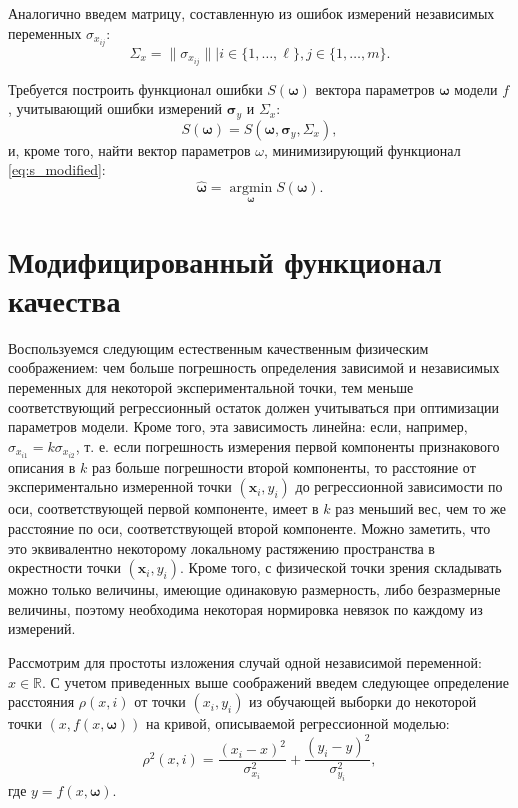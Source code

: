 \documentclass[tikz,11pt,a4paper]{article}
\newcommand{\bomega}{\boldsymbol{\omega}}
\begin{document}
Аналогично введем матрицу, составленную из ошибок измерений независимых переменных
$\sigma_{x_{ij}}$:
\[
  \Sigma_x = \| \sigma_{x_{ij}} \| | i \in \{ 1, \dots, \ell \}, j \in \{ 1, \dots, m \}.
\]

Требуется построить функционал ошибки $S(\bomega)$ вектора параметров
$\bomega$ модели $f$, учитывающий ошибки измерений $\boldsymbol{\sigma}_y$ и
$\Sigma_x$:
\begin{equation}
  S(\bomega) = S(\bomega, \boldsymbol{\sigma}_y, \Sigma_x),
  \label{eq:s_modified}
\end{equation}
и, кроме того, найти вектор параметров $\omega$, минимизирующий функционал
\eqref{eq:s_modified}:
\begin{equation}
  \hat{\bomega} = \mathop{\arg \min}\limits_{\bomega} S(\bomega).
\end{equation}

\section{Модифицированный функционал качества}

Воспользуемся следующим естественным качественным физическим соображением:
чем больше погрешность определения зависимой и независимых переменных
для некоторой экспериментальной точки, тем меньше соответствующий
регрессионный остаток должен учитываться при оптимизации параметров модели.
Кроме того, эта зависимость линейна: если, например, $\sigma_{x_{i1}} = k \sigma_{x_{i2}}$,
т. е. если погрешность измерения первой компоненты признакового описания в $k$
раз больше погрешности второй компоненты, то расстояние от экспериментально
измеренной точки $(\mathbf{x}_i, y_i)$ до регрессионной зависимости по оси,
соответствующей первой компоненте, имеет в $k$ раз меньший вес, чем то же
расстояние по оси, соответствующей второй компоненте. Можно заметить, что
это эквивалентно некоторому локальному растяжению пространства в окрестности
точки $(\mathbf{x}_i, y_i)$. Кроме того, с физической точки зрения складывать
можно только величины, имеющие одинаковую размерность, либо безразмерные
величины, поэтому необходима некоторая нормировка невязок по каждому из
измерений.

Рассмотрим для простоты изложения случай одной независимой переменной:
$x \in \mathbb{R}$. С учетом приведенных выше соображений введем
следующее определение расстояния $\rho(x, i)$
от точки $(x_i, y_i)$ из обучающей выборки до некоторой точки
$(x, f(x, \bomega))$ на кривой, описываемой регрессионной моделью:
\begin{equation}
  \rho^2(x, i) = \frac{(x_i - x)^2}{\sigma_{x_i}^2} + \frac{(y_i - y)^2}{\sigma_{y_i}^2},
  \label{eq:dist0}
\end{equation}
где $y = f(x, \bomega)$.
\end{document}
